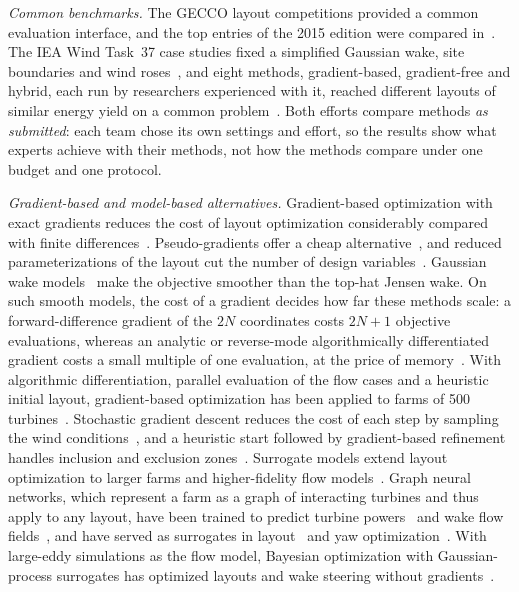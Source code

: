 \emph{Common benchmarks.} The GECCO layout competitions provided a common evaluation interface, and the top entries of the 2015 edition were compared in~\cite{Wilson2018}. The IEA Wind Task~37 case studies fixed a simplified Gaussian wake, site boundaries and wind roses~\cite{Baker2019,IEA37repo}, and eight methods, gradient-based, gradient-free and hybrid, each run by researchers experienced with it, reached different layouts of similar energy yield on a common problem~\cite{Thomas2023}. Both efforts compare methods \emph{as submitted}: each team chose its own settings and effort, so the results show what experts achieve with their methods, not how the methods compare under one budget and one protocol.

\emph{Gradient-based and model-based alternatives.} Gradient-based optimization with exact gradients reduces the cost of layout optimization considerably compared with finite differences~\cite{Guirguis2016}. Pseudo-gradients offer a cheap alternative~\cite{Quaeghebeur2021}, and reduced parameterizations of the layout cut the number of design variables~\cite{Stanley2019}. Gaussian wake models~\cite{Bastankhah2014,Tao2020} make the objective smoother than the top-hat Jensen wake. On such smooth models, the cost of a gradient decides how far these methods scale: a forward-difference gradient of the $2N$ coordinates costs $2N+1$ objective evaluations, whereas an analytic or reverse-mode algorithmically differentiated gradient costs a small multiple of one evaluation, at the price of memory~\cite{Rodrigues2024}. With algorithmic differentiation, parallel evaluation of the flow cases and a heuristic initial layout, gradient-based optimization has been applied to farms of 500 turbines~\cite{Rodrigues2024}. Stochastic gradient descent reduces the cost of each step by sampling the wind conditions~\cite{Quick2023}, and a heuristic start followed by gradient-based refinement handles inclusion and exclusion zones~\cite{CriadoRisco2024}. Surrogate models extend layout optimization to larger farms and higher-fidelity flow models~\cite{Yang2023,Wang2024,Li2025}. Graph neural networks, which represent a farm as a graph of interacting turbines and thus apply to any layout, have been trained to predict turbine powers~\cite{ParkPark2019} and wake flow fields~\cite{LiZhang2023}, and have served as surrogates in layout~\cite{ParkPark2019} and yaw optimization~\cite{LiRobert2024}. With large-eddy simulations as the flow model, Bayesian optimization with Gaussian-process surrogates has optimized layouts and wake steering without gradients~\cite{Bempedelis2024}.


